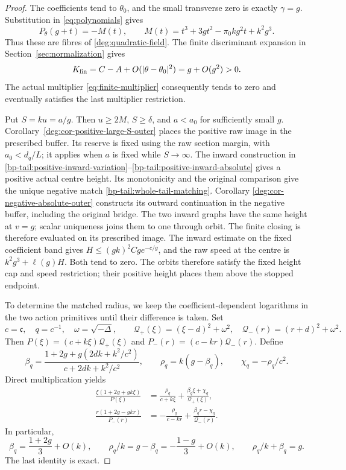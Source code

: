 \begin{proof}
The coefficients tend to \(\theta_0\), and the small transverse zero is
exactly \(\gamma=g\). Substitution in \eqref{eq:polynomials} gives
\[
 P_\theta(g+t)=-M(t),\qquad
 M(t)=t^3+3gt^2-\pi_0kg^2t+k^2g^3.
\]
Thus these are fibres of \eqref{deg:quadratic-field}. The finite
discriminant expansion in Section~\ref{sec:normalization} gives
\[
 K_{\rm fin}=C-A+O(|\theta-\theta_0|^2)=g+O(g^2)>0.
\]
The actual multiplier \eqref{eq:finite-multiplier} consequently tends
to zero and eventually satisfies the last multiplier restriction.

Put \(S=ku=a/g\). Then \(u\ge2M\), \(S\ge\delta\), and \(a<a_0\)
for sufficiently small \(g\). Corollary~\ref{deg:cor-positive-large-S-outer}
places the positive raw image in the prescribed buffer. Its reserve is
fixed using the raw section margin, with \(a_0<d_q/L\); it applies when
\(a\) is fixed while \(S\to\infty\). The inward construction in
\eqref{bp-tail:positive-inward-variation}--\eqref{bp-tail:positive-inward-absolute}
gives a positive actual centre height. Its monotonicity and the original
comparison give the unique negative match
\eqref{bp-tail:whole-tail-matching}. Corollary
\ref{deg:cor-negative-absolute-outer} constructs its outward continuation
in the negative buffer, including the original bridge. The two inward
graphs have the same height at \(v=g\); scalar uniqueness joins them
to one through orbit. The finite closing is therefore evaluated on its
prescribed image. The inward estimate on the fixed coefficient band gives
\(H\le(gk)^2Cg e^{-c/g}\), and the raw speed at the centre is
\(k^2g^3+\ell(g)H\). Both tend to zero. The orbits therefore satisfy the fixed height cap and speed restriction;
their positive height places them above the stopped endpoint.

To determine the matched radius, we keep the coefficient-dependent
logarithms in the two action primitives until their difference is taken. Set
\[
 c=\mathfrak c,\quad q=c^{-1},\quad
 \omega=\sqrt{-\Delta},\qquad
 \mathcal Q_+(\xi)=(\xi-d)^2+\omega^2,\quad
 \mathcal Q_-(r)=(r+d)^2+\omega^2.
\]
Then \(P(\xi)=(c+k\xi)\mathcal Q_+(\xi)\) and
\(P_-(r)=(c-kr)\mathcal Q_-(r)\). Define
\begin{equation}\label{rawstress:eq-quadratic-partial-coefficients}
 \beta_q=\frac{1+2g+g(2dk+k^2/c^2)}{c+2dk+k^2/c^2},\qquad
 \rho_q=k(g-\beta_q),\qquad \chi_q=-\rho_q/c^2.
\end{equation}
Direct multiplication yields
\begin{equation}\label{rawstress:eq-quadratic-partial-fractions}
 \begin{aligned}
 \frac{\xi(1+2g+gk\xi)}{P(\xi)}
   &=\frac{\rho_q}{c+k\xi}
                      +\frac{\beta_q\xi+\chi_q}{\mathcal Q_+(\xi)},\\
 \frac{r(1+2g-gkr)}{P_-(r)}
   &=-\frac{\rho_q}{c-kr}
                      +\frac{\beta_qr-\chi_q}{\mathcal Q_-(r)}.
 \end{aligned}
\end{equation}
In particular,
\[
 \beta_q=\frac{1+2g}{3}+O(k),\qquad
 \rho_q/k=g-\beta_q=-\frac{1-g}{3}+O(k),\qquad
                         \rho_q/k+\beta_q=g.
\]
The last identity is exact.


\end{proof}
